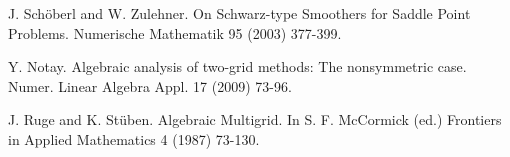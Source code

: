 
\begin{thebibliography}{10}

{\sc J. Sch\"oberl and W. Zulehner}. {On Schwarz-type Smoothers for Saddle Point Problems}. Numerische Mathematik 95 (2003) 377-399.



{\sc Y. Notay}. {Algebraic analysis of two-grid methods: The nonsymmetric case}. Numer. Linear Algebra Appl. 17 (2009) 73-96.



{\sc J. Ruge and K. St\"uben}. {Algebraic Multigrid}. In S. F. McCormick (ed.) Frontiers in Applied Mathematics 4 (1987) 73-130.

\end{thebibliography}
